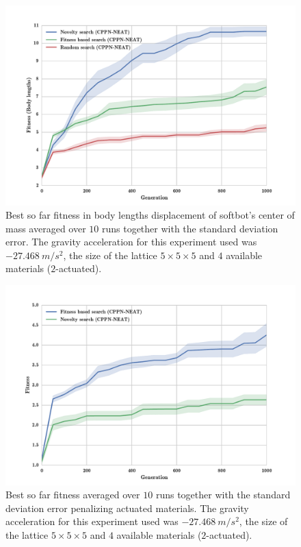 \begin{figure}
\centering
\includegraphics[width=1.0\textwidth]{Figures/Results/FitNovRandomSize5.pdf}
\caption{Best so far fitness in body lengths displacement of softbot's center of mass averaged over $10$ runs together with the standard deviation error. The gravity acceleration for this experiment used was $-27.468\   m/s^2$, the size of the lattice $5\times 5\times5$ and $4$ available materials ($2$-actuated).}
\label{fig:FitNovRandomSize5}
\end{figure}


\begin{figure}
\centering
\includegraphics[width=1.0\textwidth]{Figures/Results/FitNovSize5Pen2.pdf}
\caption[]{Best so far fitness averaged over $10$ runs together with the standard deviation error penalizing actuated materials\footnotemark. The gravity acceleration for this experiment used was $-27.468\   m/s^2$, the size of the lattice $5\times 5\times5$ and $4$ available materials ($2$-actuated).}
\label{fig:FitNovRandomSize5}
\end{figure}

